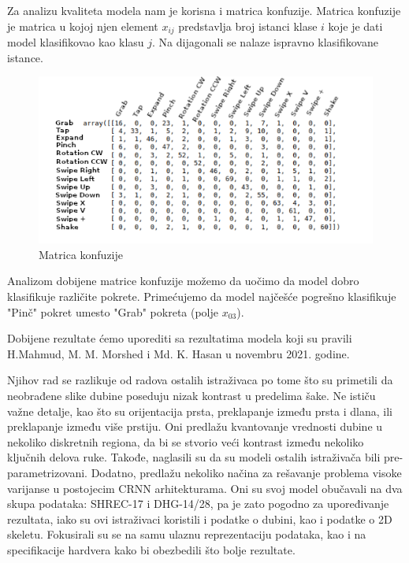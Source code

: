 \documentclass{article}
\begin{document}
Za analizu kvaliteta modela nam je korisna i matrica konfuzije. Matrica konfuzije je matrica u kojoj njen element $x_{ij}$ predstavlja broj istanci klase $i$ koje je dati model klasifikovao kao klasu $j$. Na dijagonali se nalaze ispravno klasifikovane istance.

\begin{figure}[h]
\centering
\includegraphics[scale=0.65]{matricaKonfuzije.png}
\caption{Matrica konfuzije}
\end{figure}

\newpage

Analizom dobijene matrice konfuzije možemo da uočimo da model dobro klasifikuje različite pokrete. Primećujemo da model najčešće pogrešno klasifikuje "Pinč" pokret umesto "Grab" pokreta (polje $x_{03}$).
\newline

Dobijene rezultate ćemo uporediti sa rezultatima modela koji su pravili H.Mahmud, M. M. Morshed i Md. K. Hasan u novembru 2021. godine.
\newline

Njihov rad se razlikuje od radova ostalih istraživaca po tome što su primetili da neobrađene slike dubine poseduju nizak kontrast u predelima šake. Ne ističu važne detalje, kao što su orijentacija prsta, preklapanje između prsta i dlana, ili preklapanje između više prstiju. Oni predlažu kvantovanje vrednosti dubine u nekoliko diskretnih regiona, da bi se stvorio veći kontrast između nekoliko ključnih delova ruke. Takođe, naglasili su da su modeli ostalih istraživača bili pre-parametrizovani. Dodatno, predlažu nekoliko načina za rešavanje problema visoke varijanse u postojecim CRNN arhitekturama. Oni su svoj model obučavali na dva skupa podataka: SHREC-17 i DHG-14/28, pa je zato pogodno za upoređivanje rezultata, iako su ovi istraživaci koristili i podatke o dubini, kao i podatke o 2D skeletu. Fokusirali su se na samu ulaznu reprezentaciju podataka, kao i na specifikacije hardvera kako bi obezbedili što bolje rezultate.
\newline
\end{document}
